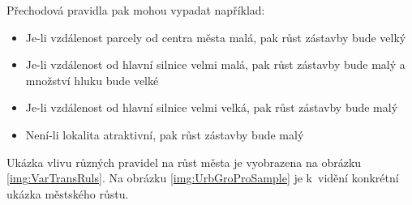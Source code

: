 Přechodová pravidla pak mohou vypadat například:
\begin{itemize}
 \item Je-li vzdálenost parcely od centra města malá, pak růst zástavby bude velký
 \item Je-li vzdálenost od hlavní silnice velmi malá, pak růst zástavby bude malý a množství hluku bude velké
 \item Je-li vzdálenost od hlavní silnice velmi velká, pak růst zástavby bude malý
 \item Není-li lokalita atraktivní, pak růst zástavby bude malý
\end{itemize}

Ukázka vlivu různých pravidel na růst města je vyobrazena na obrázku \ref{img:VarTransRuls}. Na obrázku \ref{img:UrbGroProSample} je k~vidění konkrétní ukázka městského růstu.

